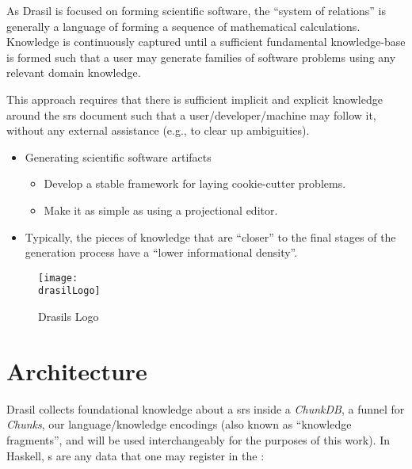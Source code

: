 As Drasil is focused on forming scientific software, the ``system of relations''
is generally a language of forming a sequence of mathematical calculations.
Knowledge is continuously captured until a sufficient fundamental knowledge-base
is formed such that a user may generate families of software problems using any
relevant domain knowledge.

This approach requires that there is sufficient implicit and explicit knowledge
around the \acs{srs} document such that a user/developer/machine may follow it,
without any external assistance (e.g., to clear up ambiguities).


\begin{itemize}

      \item Generating scientific software artifacts
            \begin{itemize}

                  \item Develop a stable framework for laying cookie-cutter
                        problems.

                  \item Make it as simple as using a projectional editor.

            \end{itemize}

      \item Typically, the pieces of knowledge that are ``closer'' to the final
            stages of the generation process have a ``lower informational
            density''.

\end{itemize}

\begin{figure}[H]
      \centering
      \caption{Drasils Logo}
      \label{fig:drasilLogo}
      \texttt{[image: \\drasilLogo]}
\end{figure}

\drasilPersonification

\section{Architecture}

Drasil collects foundational knowledge about a \acs{srs} inside a
\textit{ChunkDB}, a funnel for \textit{Chunks}, our language/knowledge encodings
(also known as ``knowledge fragments'', and will be used interchangeably for the
purposes of this work). In Haskell, \Chunk{}s are any data that one may register
in the \ChunkDB{}:


